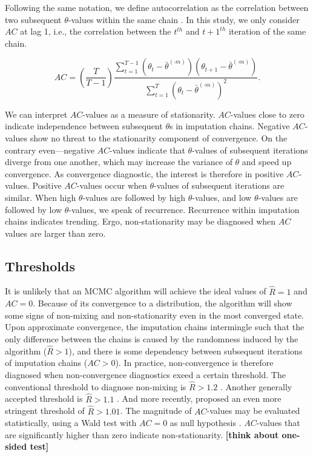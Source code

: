 \documentclass[Royal,times,sageh]{sagej}
\begin{document}
Following the same notation, we define autocorrelation as the correlation between two subsequent \(\theta\)-values within the same chain \citep[p.~147]{lync07}. In this study, we only consider \(AC\) at lag 1, i.e., the correlation between the \(t^{th}\) and \(t+1^{th}\) iteration of the same chain.

\begin{equation*}
AC = \left( \frac{T}{T-1} \right) \frac{\sum_{t=1}^{T-1}(\theta_t - \bar{\theta}^{(\cdot m)})(\theta_{t+1} - \bar{\theta}^{(\cdot m)})}{\sum_{t=1}^{T}(\theta_t - \bar{\theta}^{(\cdot m)})^2}.
\end{equation*}

We can interpret \(AC\)-values as a measure of stationarity. \(AC\)-values close to zero indicate independence between subsequent \(\theta\)s in imputation chains. Negative \(AC\)-values show no threat to the stationarity component of convergence. On the contrary even---negative \(AC\)-values indicate that \(\theta\)-values of subsequent iterations diverge from one another, which may increase the variance of \(\theta\) and speed up convergence. As convergence diagnostic, the interest is therefore in positive \(AC\)-values. Positive \(AC\)-values occur when \(\theta\)-values of subsequent iterations are similar. When high \(\theta\)-values are followed by high \(\theta\)-values, and low \(\theta\)-values are followed by low \(\theta\)-values, we speak of recurrence. Recurrence within imputation chains indicates trending. Ergo, non-stationarity may be diagnosed when \(AC\) values are larger than zero.

\hypertarget{thresholds}{%
\subsection{Thresholds}\label{thresholds}}

It is unlikely that an MCMC algorithm will achieve the ideal values of \(\widehat{R}=1\) and \(AC=0\). Because of its convergence to a distribution, the algorithm will show some signs of non-mixing and non-stationarity even in the most converged state. Upon approximate convergence, the imputation chains intermingle such that the only difference between the chains is caused by the randomness induced by the algorithm (\(\widehat{R} > 1\)), and there is some dependency between subsequent iterations of imputation chains (\(AC > 0\)). In practice, non-convergence is therefore diagnosed when non-convergence diagnostics exeed a certain threshold. The conventional threshold to diagnose non-mixing is \(\widehat{R} > 1.2\) \citep{gelm92}. Another generally accepted threshold is \(\widehat{R} > 1.1\) \citep{gelm13}. And more recently, \citet{veht19} proposed an even more stringent threshold of \(\widehat{R} > 1.01\). The magnitude of \(AC\)-values may be evaluated statistically, using a Wald test with \(AC=0\) as null hypothesis \citep{box15}. \(AC\)-values that are significantly higher than zero indicate non-stationarity. \textbf{{[}think about one-sided test{]}}
\end{document}
